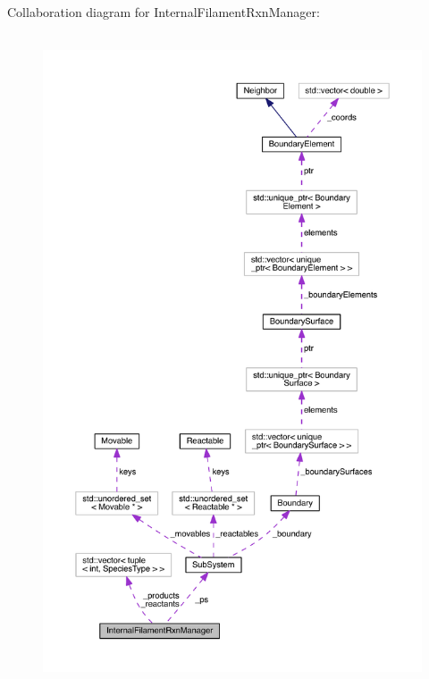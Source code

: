 Collaboration diagram for Internal\+Filament\+Rxn\+Manager\+:
\nopagebreak
\begin{figure}[H]
\begin{center}
\leavevmode
\includegraphics[height=550pt]{classInternalFilamentRxnManager__coll__graph}
\end{center}
\end{figure}
